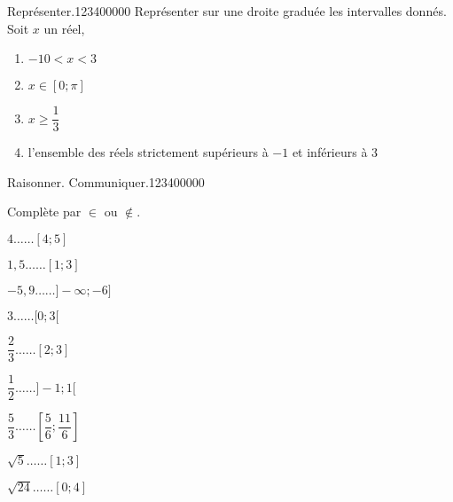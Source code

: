 \begin{pageAD}
\begin{ExoCad}{Représenter.}{1234}{0}{0}{0}{0}{0}
Représenter sur une droite graduée les intervalles donnés. Soit $x$ un réel,
\begin{enumerate}[leftmargin=*]
	\item $-10< x < 3$  
	\item $ x \in [0;\pi]$  
	\item $ x \geq \dfrac{1}{3}$  
	\item l'ensemble des réels strictement supérieurs à $-1$ et inférieurs à $3$  
\end{enumerate}
\end{ExoCad}


 
 
 
\begin{ExoCad}{Raisonner. Communiquer.}{1234}{0}{0}{0}{0}{0}

Complète par  $\in$ ou $\notin$.

\begin{enumerate}
\begin{minipage}{0.32\linewidth}
\item $4 \ldots \ldots [4;5]$ \vspace{0.1cm}
\item $1,5 \ldots \ldots [1;3]$\vspace{0.1cm}
\item $-5,9 \ldots \ldots ]-\infty;-6]$
\end{minipage}
\hfill
\begin{minipage}{0.32\linewidth}
\item $3 \ldots \ldots [0;3[$\vspace{0.1cm}
\item $\dfrac{2}{3} \ldots \ldots [2;3]$\vspace{0.1cm}
\item $\dfrac{1}{2} \ldots \ldots ]-1;1[$
\end{minipage}
\hfill
\begin{minipage}{0.32\linewidth}
\item $\dfrac{5}{3} \ldots \ldots \left[ \dfrac{5}{6}; \dfrac{11}{6}  \right]$ 
\item $\sqrt{5} \ldots \ldots \left[ 1;3 \right]$\vspace{0.1cm}
\item $\sqrt{24} \ldots \ldots \left[0; 4\right]$ 
\end{minipage}

\end{enumerate}
 
\end{ExoCad}
 
\end{pageAD} %

